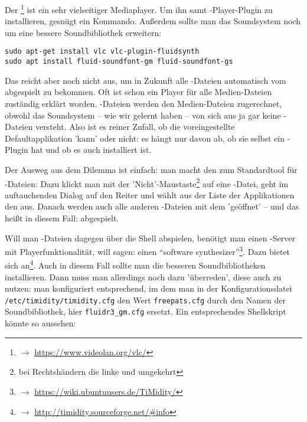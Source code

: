Der \footnote{$\rightarrow$
\href{https://www.videolan.org/vlc/}{https://www.videolan.org/vlc/}} ist ein sehr
vielseitiger Mediaplayer. Um ihn samt -Player-Plugin zu installieren, 
gesnügt ein Kommando. Außerdem sollte man das Soundsystem noch um eine
bessere Soundbibliothek erweitern:

\begin{verbatim}
sudo apt-get install vlc vlc-plugin-fluidsynth
sudo apt install fluid-soundfont-gm fluid-soundfont-gs
\end{verbatim}

Das reicht aber noch nicht aus, um in Zukunft alle -Dateien
automatisch vom  abgespielt zu bekommen. Oft ist schon ein Player für
alle Medien-Dateien zuständig erklärt worden. -Dateien werden den
Medien-Dateien zugerechnet, obwohl das Soundsystem -- wie wir gelernt haben --
von sich aus ja gar keine -Dateien versteht. Also ist es reiner
Zufall, ob die voreingestellte Defaultapplikation  'kann' oder nicht:
es hängt nur davon ab, ob sie selbst ein -Plugin hat und ob es auch
installiert ist.

Der Ausweg aus dem Dilemma ist einfach: man macht den  zum Standardtool
für -Dateien: Dazu klickt man mit der 'Nicht'-Maustaste\footnote{bei
Rechtshändern die linke und umgekehrt} auf eine -Datei, geht im
auftauchenden Dialog auf den Reiter  und wählt aus der Liste der
Applikationen den   aus. Danach werden auch alle anderen
-Dateien mit dem   'geöffnet' -- und das heißt in diesem
Fall: abgespielt.

Will man -Dateien dagegen über die Shell abspielen, benötigt man einen
-Server mit Playerfunktionalität, will sagen: einen \enquote{software
synthesizer}\footnote{$\rightarrow$
\href{https://wiki.ubuntuusers.de/TiMidity/}{https://wiki.ubuntuusers.de/TiMidity/}}.
Dazu bietet sich  an\footnote{$\rightarrow$
\href{http://timidity.sourceforge.net/{\#}info}{http://timidity.sourceforge.net/{\#}info}}.
Auch in diesem Fall sollte man die besseren Soundbibliotheken installieren. Dann
muss man  allerdings noch dazu 'überreden', diese auch zu nutzen:
man konfiguriert  entsprechend, im dem man in der
Konfigurationsdatei \texttt{/etc/timidity/timidity.cfg} den Wert
\texttt{freepats.cfg} durch den Namen der Soundbibliothek, hier
\texttt{fluidr3\_gm.cfg} ersetzt. Ein entsprechendes Shellskript könnte so
aussehen:

